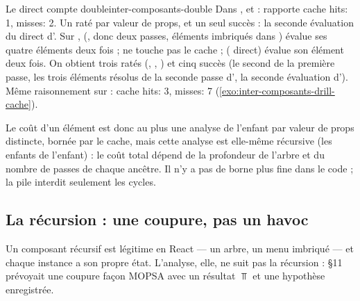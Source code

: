 \begin{exemple}{Le  direct compte double}{inter-composants-double}
Dans ,  et
 :  rapporte
\og cache hits: 1, misses: 2\fg. Un raté par valeur de props, et un seul succès : la seconde
évaluation du  direct d'. Sur , 
(, donc deux passes, éléments imbriqués dans ) évalue ses
quatre éléments deux fois ;  ne touche pas le cache ; 
( direct) évalue son élément deux fois. On obtient trois ratés
(, , ) et cinq succès (le second
 de la première passe, les trois éléments résolus de la seconde passe
d', la seconde évaluation d'). Même raisonnement sur  :
\og cache hits: 3, misses: 7\fg{} (\cref{exo:inter-composants-drill-cache}).
\end{exemple}

Le coût d'un élément est donc au plus une analyse de l'enfant par valeur de props distincte,
bornée par le cache, mais cette analyse est elle-même récursive (les enfants de l'enfant) : le
coût total dépend de la profondeur de l'arbre et du nombre de passes de chaque ancêtre. Il n'y
a pas de borne plus fine dans le code ; la pile interdit seulement les cycles.

\subsection{La récursion : une coupure, pas un havoc}
\label{sec:inter-composants-recursion}

Un composant récursif est légitime en React --- un arbre, un menu imbriqué --- et chaque
instance a son propre état. L'analyse, elle, ne suit pas la récursion :  §11 prévoyait
une coupure \og façon MOPSA\fg{} avec un résultat $\Top$ et une hypothèse
 enregistrée.

